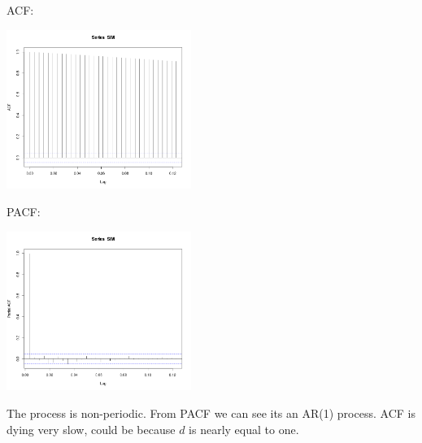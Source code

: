 \documentclass[11pt,paper=a4,answers]{exam}
\begin{document}
\begin{questions}
\begin{enumerate}[(a)]
\begin{enumerate}
        \newpage
        ACF:\\
        \centerline{\includegraphics[width=6cm]{simacf.png}}
        PACF:\\
        \centerline{\includegraphics[width=6cm]{simpacf.png}}
        The process is non-periodic. From PACF we can see its an AR(1) process. ACF is dying very slow, could be because $d$ is nearly equal to one.


\end{enumerate}
\end{enumerate}
\end{questions}
\end{document}
